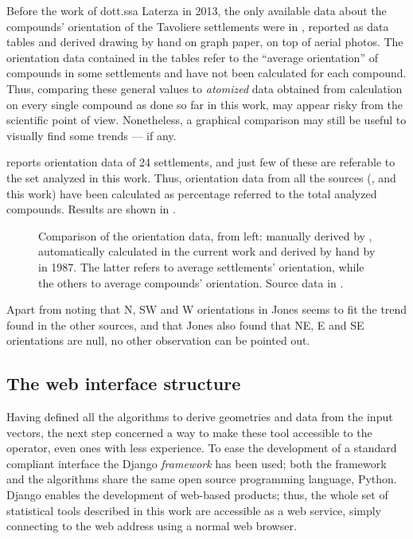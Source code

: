             Before the work of dott.ssa Laterza in 2013, the only available data about the compounds' orientation of the Tavoliere settlements were in \textcite[appx.~IV]{jones-tavoliere}, reported as data tables and derived drawing by hand on graph paper, on top of aerial photos. The orientation data contained in the tables refer to the ``average orientation'' of compounds in some settlements and have not been calculated for each compound. Thus, comparing these general values to \emph{atomized} data obtained from calculation on every single compound as done so far in this work, may appear risky from the scientific point of view. Nonetheless, a graphical comparison may still be useful to visually find some trends --- if any. 

            \cite{jones-tavoliere} reports orientation data of 24 settlements, and just few of these are referable to the set analyzed in this work. Thus, orientation data from all the sources (\cite{laterza}, \cite{jones-tavoliere} and this work) have been calculated as percentage referred to the total analyzed compounds. Results are shown in .

            \begin{figure}[H]
                \centering
                \begin{tikzpicture}
                    
                \end{tikzpicture}
                \caption[Comparison of automatically derived orientation data with the other sources]{Comparison of the orientation data, from left: manually derived by \citeauthor{laterza}, automatically calculated in the current work and derived by hand by \citeauthor{jones-tavoliere} in 1987. The latter refers to average settlements' orientation, while the others to average compounds' orientation. Source data in .}
                \label{fig:graph-orient-jones}
            \end{figure}
            
            Apart from noting that N, SW and W orientations in Jones seems to fit the trend found in the other sources, and that Jones also found that NE, E and SE orientations are null, no other observation can be pointed out.

        \subsection{The web interface structure\label{sec:webgis}}
            Having defined all the algorithms to derive geometries and data from the input vectors, the next step concerned a way to make these tool accessible to the operator, even ones with less experience. To ease the development of a standard compliant interface the Django \emph{framework} has been used; both the framework and the algorithms share the same open source programming language, Python.
            Django enables the development of web-based products; thus, the whole set of statistical tools described in this work are accessible as a web service, simply connecting to the web address using a normal web browser.

